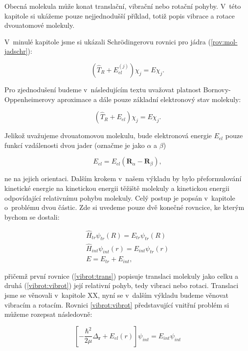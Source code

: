 Obecná molekula může konat translační, vibrační nebo rotační pohyby. V~této kapitole si ukážeme pouze nejjednodušší příklad, totiž popis vibrace a rotace dvouatomové molekuly.

\noindent V~minulé kapitole jsme si ukázali Schrödingerovu rovnici pro jádra (\ref{rov:mol-jadschr}):

\begin{displaymath}
\left(\hat{T}_R+E_{el}^{(j)}\right)\chi_j = E \chi_j.
\end{displaymath}

\noindent Pro zjednodušení budeme v~následujícím textu uvažovat platnost Bornovy-Oppenheimerovy aproximace a dále pouze základní elektronový stav molekuly:

\begin{displaymath}
\left(\hat{T}_R+E_{el}\right)\chi_j = E \chi_j.
\end{displaymath}
 
\noindent Jelikož uvažujeme dvouatomovou molekulu, bude elektronová energie $E_{el}$ pouze funkcí vzdálenosti dvou jader (označme je jako $\alpha$ a $\beta$)

\begin{displaymath}
E_{el}=E_{el}(\textbf{R}_{\alpha}-\textbf{R}_{\beta}),
\end{displaymath} 

\noindent ne na jejich orientaci.
Dalším krokem v~našem výkladu by bylo přeformulování kinetické energie na kinetickou energii těžiště molekuly a kinetickou energii odpovídající relativnímu pohybu molekuly. Celý postup je popsán v~kapitole o~problému dvou částic. Zde si uvedeme pouze dvě konečné rovncice, ke kterým bychom se dostali:

\begin{eqnarray}
\hat{H}_{tr}\psi_{tr}(R)=E_{tr}\psi_{tr}(R)
\label{vibrot:trans}\\
\hat{H}_{int}\psi_{int}(r)=E_{int}\psi_{tr}(r)
\label{vibrot:vibrot}\\
E=E_{tr}+E_{int},
\end{eqnarray}

\noindent přičemž první rovnice (\ref{vibrot:trans}) popisuje translaci molekuly jako celku a druhá (\ref{vibrot:vibrot}) její relativní pohyb, tedy vibraci nebo rotaci. Translaci jsme se  věnovali v~kapitole XX, nyní se v~dalším výkladu budeme věnovat vibracím a rotacím. Rovnici \ref{vibrot:vibrot} představující vnitřní problém si můžeme rozepsat následovně:

\begin{equation}
\left[-\frac{\hbar^2}{2\mu}\Delta_{\textbf{r}}+E_{el}(r)\right]\psi_{int}=E_{int}\psi_{int}
\label{vibrot:vibrot2}
\end{equation}


